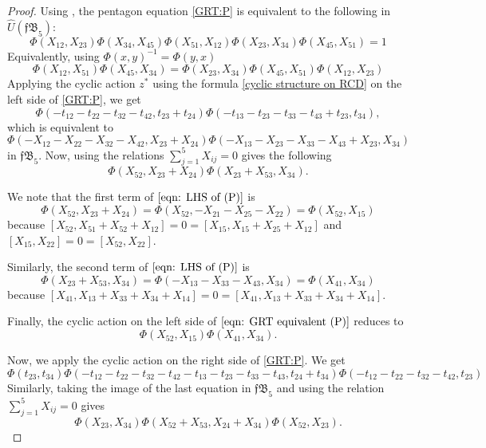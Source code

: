 \documentclass{amsart}
\theoremstyle{definition}
\numberwithin{equation}{section}
\begin{document}
\begin{proof}
Using \cite[Lemma 5]{Furusho_pentagon}, the pentagon equation \eqref{GRT:P} is equivalent to the following in $\hat{U}(\mathfrak{fB}_5)$:
\begin{equation}
\Phi(X_{12}, X_{23})  \Phi(X_{34}, X_{45})  \Phi(X_{51}, X_{12})  \Phi(X_{23}, X_{34})  \Phi(X_{45}, X_{51}) = 1
\end{equation}
Equivalently, using $\Phi(x,y)^{-1} = \Phi(y,x)$                   
\begin{equation}\label{eqn: GRT equivalent (P)}
   \Phi(X_{12}, X_{51})  \Phi(X_{45},X_{34}) = \Phi(X_{23}, X_{34})  \Phi(X_{45}, X_{51})  \Phi(X_{12}, X_{23})  
\end{equation}
Applying the cyclic action $z^*$ using the formula \eqref{cyclic structure on RCD} on the left side of \eqref{GRT:P}, we get 
\[\Phi(-t_{12}-t_{22}-t_{32}-t_{42},t_{23}+t_{24})  \Phi(-t_{13}-t_{23}-t_{33}-t_{43} +t_{23},t_{34}),\]
which is equivalent to \[\Phi(-X_{12}-X_{22}-X_{32}-X_{42},X_{23}+X_{24})  \Phi(-X_{13}-X_{23}-X_{33}-X_{43}+X_{23},X_{34})\] in $\mathfrak{fB}_5$. Now, using the relations $\sum_{j=1}^{5} X_{ij} = 0$ gives the following
\begin{equation}\label{eqn: LHS of (P)}
    \Phi(X_{52},X_{23}+X_{24})  \Phi(X_{23}+X_{53},X_{34}).
\end{equation}

We note that the first term of $\eqref{eqn: LHS of (P)}$ is \[\Phi(X_{52},X_{23}+X_{24}) = \Phi(X_{52},-X_{21}- X_{25}-X_{22}) = \Phi(X_{52},X_{15})\] because $[X_{52}, X_{51}+X_{52}+X_{12}] = 0 = [X_{15}, X_{15} + X_{25} + X_{12}]$ and $[X_{15},X_{22}] = 0 = [X_{52},X_{22}]$. 

Similarly, the second term of $\eqref{eqn: LHS of (P)}$ is
\[\Phi(X_{23}+X_{53},X_{34}) = \Phi(-X_{13}- X_{33} - X_{43},X_{34}) = \Phi(X_{41}, X_{34})\]
because $[X_{41}, X_{13}+X_{33}+X_{34}+X_{14}] = 0 = [X_{41}, X_{13}+X_{33}+X_{34}+X_{14}]$.

Finally, the cyclic action on the left side of $\eqref{eqn: GRT equivalent (P)}$ reduces to 
\begin{equation}\label{eqn: final LHS of (P)}
    \Phi(X_{52},X_{15})  \Phi(X_{41}, X_{34}).
\end{equation}

Now, we apply the cyclic action on the right side of \eqref{GRT:P}. We get 
\[\Phi(t_{23},t_{34})  \Phi(-t_{12}-t_{22}-t_{32}-t_{42}-t_{13}-t_{23}-t_{33}-t_{43}, t_{24}+t_{34})  \Phi(-t_{12}-t_{22}-t_{32}-t_{42},t_{23})\]
Similarly, taking the image of the last equation in $\mathfrak{fB}_5$ and using the relation $\sum_{j=1}^{5} X_{ij} = 0$ gives 
\begin{equation}\label{eqn: RHS of (P)}
    \Phi(X_{23},X_{34})  \Phi(X_{52}+X_{53},X_{24}+X_{34})  \Phi(X_{52},X_{23}). 
\end{equation} 


\end{proof}
\end{document}

